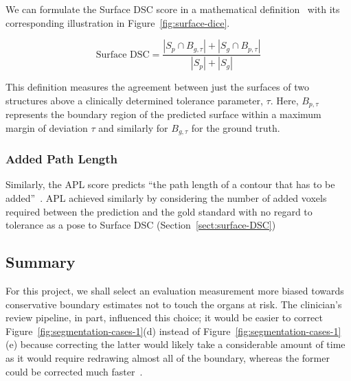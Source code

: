 \documentclass[11pt,twoside]{report}
\begin{document}
We can formulate the Surface DSC score in a mathematical definition~\cite{Sherer2021-le} with its corresponding illustration in Figure~\ref{fig:surface-dice}.

\begin{equation*}
 \text{Surface DSC} = \frac{|S_p \cap B_{g,\tau}| + |S_g \cap B_{p,\tau}|}{|S_p| + |S_g|}
\end{equation*}

This definition measures the agreement between just the surfaces of two structures above a clinically determined tolerance parameter, $\tau$. Here, $B_{p,\tau}$ represents the boundary region of the predicted surface within a maximum margin of deviation $\tau$ and similarly for $B_{g,\tau}$ for the ground truth.

\subsubsection{Added Path Length}

Similarly, the APL score predicts ``the path length of a contour that has to be added''~\cite{APL}. APL achieved similarly by considering the number of added voxels required between the prediction and the gold standard with no regard to tolerance as a pose to Surface DSC (Section~\ref{sect:surface-DSC})



\subsection{Summary}


For this project, we shall select an evaluation measurement more biased towards conservative boundary estimates not to touch the organs at risk. The clinician's review pipeline, in part, influenced this choice; it would be easier to correct Figure~\ref{fig:segmentation-cases-1}(d) instead of Figure~\ref{fig:segmentation-cases-1}(e) because correcting the latter would likely take a considerable amount of time as it would require redrawing almost all of the boundary, whereas the former could be corrected much faster~\cite{Nikolov2021-xe}.
\end{document}
